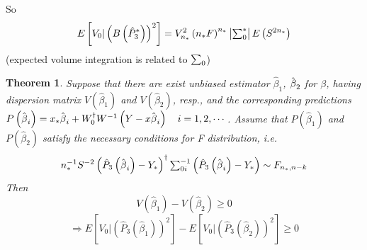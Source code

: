 \documentclass{article}
\newtheorem{theorem}{Theorem}
\begin{document}
So%
\begin{equation*}
E\left[ V_{0}|\left( B\left( \hat{P}_{3}^{\ast }\right) \right) ^{2}\right]
=V_{n_{\ast }}^{2}\left( n_{\ast }F\right) ^{n_{\ast }}\left\vert
\mathop{\textstyle \sum }\nolimits_{0}^{\ast }\right\vert E\left( S^{2n_{\ast }}\right)
\end{equation*}%
(expected volume integration is related to $\mathop{\textstyle \sum }\nolimits_{0}$)

\bigskip

\begin{theorem}
Suppose that there are exist unbiased estimator $\hat{\beta}_{1}$, $\hat{%
\beta}_{2}$ for $\beta $, having dispersion matrix $V\left( \hat{\beta}%
_{1}\right) $ and $V\left( \hat{\beta}_{2}\right) $, resp., and the
corresponding predictions $P\left( \hat{\beta}_{i}\right) =x_{\ast }\hat{%
\beta}_{i}+W_{0}^{\dagger }W^{-1}\left( Y-x\hat{\beta}_{i}\right) \quad
i=1,2,\cdots $.\newline
Assume that $P\left( \hat{\beta}_{1}\right) $ and $P\left( \hat{\beta}%
_{2}\right) $ satisfy the necessary conditions for F distribution, i.e. 
\begin{equation*}
n_{\ast }^{-1}S^{-2}\left( \hat{P}_{3}\left( \hat{\beta}_{i}\right) -Y_{\ast
}\right) ^{\dagger }\tsum\nolimits_{0i}^{-1}\left( \hat{P}_{3}\left( \hat{%
\beta}_{i}\right) -Y_{\ast }\right) \sim F_{n_{\ast },n-k}
\end{equation*}%
Then%
\begin{equation*}
V\left( \hat{\beta}_{1}\right) -V\left( \hat{\beta}_{2}\right) \geq 0
\end{equation*}%
\begin{equation*}
\Rightarrow E\left[ V_{0}|\left( \hat{P}_{3}\left( \hat{\beta}_{1}\right)
\right) ^{2}\right] -E\left[ V_{0}|\left( \hat{P}_{3}\left( \hat{\beta}%
_{2}\right) \right) ^{2}\right] \geq 0
\end{equation*}
\end{theorem}
\end{document}
